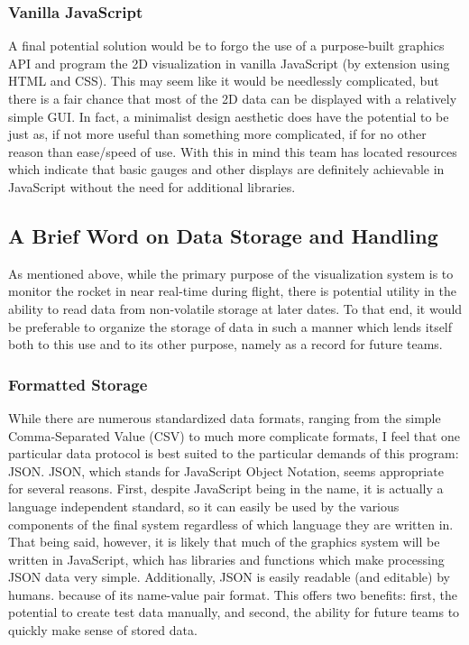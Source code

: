 \documentclass[onecolumn, draftclsnofoot,10pt, compsoc]{IEEEtran}
\begin{document}
	\subsubsection{Vanilla JavaScript}
		A final potential solution would be to forgo the use of a purpose-built graphics API and program the 2D visualization in vanilla JavaScript (by extension using HTML and CSS).
		This may seem like it would be needlessly complicated, but there is a fair chance that most of the 2D data can be displayed with a relatively simple GUI.
		In fact, a minimalist design aesthetic does have the potential to be just as, if not more useful than something more complicated, if for no other reason than ease/speed of use.
		With this in mind this team has located resources which indicate that basic gauges and other displays are definitely achievable in JavaScript without the need for additional libraries. \cite{vanjs}

\subsection{A Brief Word on Data Storage and Handling}
	As mentioned above, while the primary purpose of the visualization system is to monitor the rocket in near real-time during flight, there is potential utility in the ability to read data from non-volatile storage at later dates.
	To that end, it would be preferable to organize the storage of data in such a manner which lends itself both to this use and to its other purpose, namely as a record for future teams.
	
	\subsubsection{Formatted Storage}
		While there are numerous standardized data formats, ranging from the simple Comma-Separated Value (CSV) to much more complicate formats, I feel that one particular data protocol is best suited to the particular demands of this program: JSON.
		JSON, which stands for JavaScript Object Notation, seems appropriate for several reasons. 
		First, despite JavaScript being in the name, it is actually a language independent standard, so it can easily be used by the various components of the final system regardless of which language they are written in. \cite{json}
		That being said, however, it is likely that much of the graphics system will be written in JavaScript, which has libraries and functions which make processing JSON data very simple.
		Additionally, JSON is easily readable (and editable) by humans. because of its name-value pair format. \cite{json}
		This offers two benefits: first, the potential to create test data manually, and second, the ability for future teams to quickly make sense of stored data.
		
\end{document}
